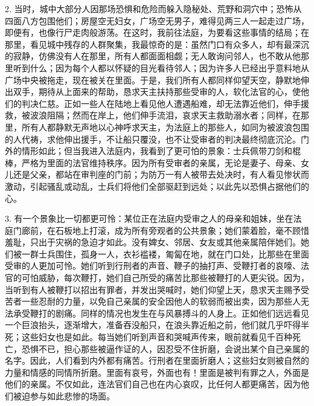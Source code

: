 2. 当时，城中大部分人因那场恐惧和危险而躲入隐秘处、荒野和洞穴中；恐怖从四面八方包围他们；房屋空无妇女，广场空无男子，难得见两三人一起走过广场，即便有，也像行尸走肉般游荡。在这时，我前往法庭，为要看这些事情的结局；在那里，看见城中残存的人群聚集，我最惊奇的是：虽然门口有众多人，却有最深沉的寂静，仿佛没有人在那里，所有人都面面相觑；无人敢询问邻人，也不敢从他那里听到什么；因为每个人都以怀疑的目光看待邻人；因为许多人已经出乎意料地从广场中央被拖走，现在被关在里面。于是，我们所有人都同样仰望天空，静默地伸出双手，期待从上面来的帮助，恳求天主扶持那些受审的人，软化法官的心，使他们的判决仁慈。正如一些人在陆地上看见他人遭遇船难，却无法靠近他们，伸手援救，被波浪阻隔；然而在岸上，他们伸手流泪，哀求天主救助溺水者；同样，在那里，所有人都静默无声地以心神呼求天主，为法庭上的那些人，如同为被波浪包围的人代祷，求他伸出援手，不让船只覆没，也不让受审者的判决最终彻底沉沦。门外的情形如此；但当我进入法庭内，我看到了更可怕的景象：士兵佩带刀剑和棍棒，严格为里面的法官维持秩序。因为所有受审者的亲属，无论是妻子、母亲、女儿还是父亲，都站在审判座的门前；为防万一有人被带去处决时，有人看见惨状而激动，引起骚乱或动乱，士兵们将他们全部驱赶到远处；以此先以恐惧占据他们的心。\par

3. 有一个景象比一切都更可怜：某位正在法庭内受审之人的母亲和姐妹，坐在法庭门廊前，在石板地上打滚，成为所有旁观者的公共景象；她们蒙着脸，毫不顾惜羞耻，只出于灾祸的急迫才如此。没有婢女、邻居、女友或其他亲属陪伴她们。她们被一群士兵围住，孤身一人，衣衫褴褛，匍匐在地，就在门口处，比那些在里面受审的人更加可怜。她们听到行刑者的声音、鞭子的抽打声、受鞭打者的哀嚎、法官的可怕威胁，每次鞭打，她们自己所受的痛苦比那些被鞭打的人更尖锐。因为，当听到有人被鞭打以招出有罪者，并发出哭喊时，她们仰望上天，恳求天主赐予受苦者一些忍耐的力量，以免自己亲属的安全因他人的软弱而被出卖，因为那些人无法承受鞭打的剧痛。同样的情况也发生在与风暴搏斗的人身上。正如他们远远看见一个巨浪抬头，逐渐增大，准备吞没船只，在浪头靠近船之前，他们就几乎吓得半死；这些妇女也是如此。每当她们听到声音和哭喊声传来，眼前就看见千百种死亡，恐惧不已，担心那些被逼作证的人，因忍受不住折磨，会说出某个自己亲属的名字。因此，人们看到内外都有痛苦。行刑者在里面折磨人；这些妇女则被自然的力量和情感的同情所折磨。里面有哀号，外面也有！里面是被判有罪之人，外面是他们的亲属。不仅如此，连法官们自己也在内心哀叹，比任何人都更痛苦，因为他们被迫参与如此悲惨的场面。\par

